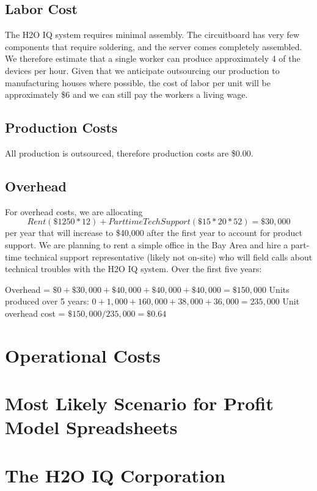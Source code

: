 \documentclass[11pt]{article}
\begin{document}
\subsection{Labor Cost}

The H2O IQ system requires minimal assembly.  The circuitboard has very few components that require soldering, and the server comes completely assembled.  We therefore estimate that a single worker can produce approximately 4 of the devices per hour.  Given that we anticipate outsourcing our production to manufacturing houses where possible, the cost of labor per unit will be approximately \$6 and we can still pay the workers a living wage.

\subsection{Production Costs}

All production is outsourced, therefore production costs are \$0.00.

\subsection{Overhead}

For overhead costs, we are allocating $$Rent (\$1250 * 12) + Part time Tech Support (\$15*20*52) = \$30,000$$ per year that will increase to \$40,000 after the first year to account for product support.  We are planning to rent a simple office in the Bay Area and hire a part-time technical support representative (likely not on-site) who will field calls about technical troubles with the H2O IQ system. Over the first five years:

Overhead = $\$0 + \$30,000 + \$40,000 + \$40,000 + \$40,000 = \$150,000$
Units produced over 5 years: $0 + 1,000 + 160,000 + 38,000 + 36,000 = 235,000$
Unit overhead cost = $\$150,000/235,000 = \$0.64$

\section{Operational Costs}

\section{Most Likely Scenario for Profit Model Spreadsheets}

\section{The H2O IQ Corporation}
\end{document}
